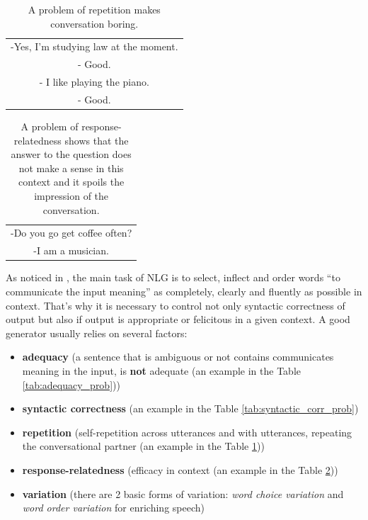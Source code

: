 \begin{table}[ht]
\centering
 \begin{tabular}{|c|} 
 \hline
  -Yes, I'm studying law at the moment.\\
  - Good. \\
  - I like playing the piano. \\
  - Good. \\
 \hline
 \end{tabular}
 \caption{A problem of repetition makes conversation boring.}
\label{tab:repetition_prob}
\end{table}

\begin{table}[ht]
\centering
 \begin{tabular}{|c|} 
 \hline
 -Do you go get coffee often? \\
 -I am a musician. \\
 \hline
 \end{tabular}
 \caption{A problem of response-relatedness shows that the answer to the question does not make a sense in this context and it spoils the impression of the conversation.}
\label{tab:response_relatedness_prob}
\end{table}

As noticed in \cite{stent2005evaluating}, the main task of NLG is to select, inflect and order words ``to communicate the input meaning'' as completely, clearly and fluently as possible in context. That's why it is necessary to control not only syntactic correctness of output but also if output is appropriate or felicitous in a given context. A good generator usually relies on several factors:
\begin{itemize}
  \item \textbf{adequacy} (a sentence that is ambiguous or not contains communicates meaning in the input, is \textbf{not} adequate (an example in the Table \ref{tab:adequacy_prob}))  
  \item \textbf{syntactic correctness} (an example in the Table \ref{tab:syntactic_corr_prob})
  \item \textbf{repetition} (self-repetition across utterances and with utterances, repeating the conversational partner (an example in the Table \ref{tab:repetition_prob}))
  \item \textbf{response-relatedness} (efficacy in context (an example in the Table \ref{tab:response_relatedness_prob}))
  \item \textbf{variation} (there are 2 basic forms of variation: \textit{word choice variation} and \textit{word order variation} for enriching speech)
\end{itemize}

